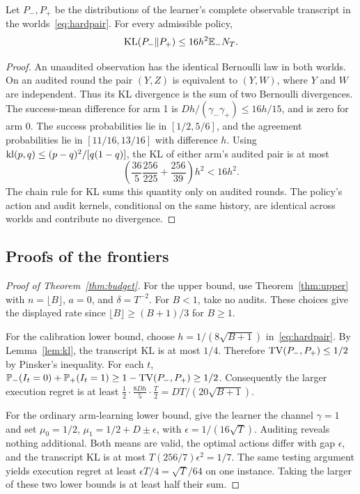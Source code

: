 \begin{lemma}\label{lem:kl}
Let $P_-,P_+$ be the distributions of the learner's complete observable transcript in the worlds~\eqref{eq:hardpair}. For every admissible policy,
\begin{equation}
\operatorname{KL}(P_-\Vert P_+)\leq16h^2\mathbb{E}_-N_T.
\label{eq:transcriptkl}
\end{equation}
\end{lemma}
\begin{proof}
An unaudited observation has the identical Bernoulli law in both worlds. On an audited round the pair $(Y,Z)$ is equivalent to $(Y,W)$, where $Y$ and $W$ are independent. Thus its KL divergence is the sum of two Bernoulli divergences. The success-mean difference for arm 1 is
$Dh/(\gamma_-\gamma_+)\leq16h/15$, and is zero for arm 0. The success probabilities lie in $[1/2,5/6]$, and the agreement probabilities lie in $[11/16,13/16]$ with difference $h$. Using $\operatorname{kl}(p,q)\leq(p-q)^2/[q(1-q)]$, the KL of either arm's audited pair is at most
\begin{equation}
\left(\frac{36}{5}\frac{256}{225}+\frac{256}{39}\right)h^2<16h^2.
\label{eq:klconstant}
\end{equation}
The chain rule for KL sums this quantity only on audited rounds. The policy's action and audit kernels, conditional on the same history, are identical across worlds and contribute no divergence.
\end{proof}

\subsection{Proofs of the frontiers}
\begin{proof}[Proof of Theorem~\ref{thm:budget}]
For the upper bound, use Theorem~\ref{thm:upper} with $n=\lfloor B\rfloor$, $a=0$, and $\delta=T^{-2}$. For $B<1$, take no audits. These choices give the displayed rate since $\lfloor B\rfloor\geq(B+1)/3$ for $B\geq1$.

For the calibration lower bound, choose $h=1/(8\sqrt{B+1})$ in~\eqref{eq:hardpair}. By Lemma~\ref{lem:kl}, the transcript KL is at most $1/4$. Therefore $\operatorname{TV}(P_-,P_+)\leq1/2$ by Pinsker's inequality. For each $t$,
$\mathbb{P}_-(I_t=0)+\mathbb{P}_+(I_t=1)\geq1-\operatorname{TV}(P_-,P_+)\geq1/2$.
Consequently the larger execution regret is at least
$\frac12\cdot\frac{8Dh}{5}\cdot\frac T2=DT/(20\sqrt{B+1})$.

For the ordinary arm-learning lower bound, give the learner the channel $\gamma=1$ and set $\mu_0=1/2$, $\mu_1=1/2+D\pm\epsilon$, with $\epsilon=1/(16\sqrt T)$. Auditing reveals nothing additional. Both means are valid, the optimal actions differ with gap $\epsilon$, and the transcript KL is at most $T(256/7)\epsilon^2=1/7$. The same testing argument yields execution regret at least $\epsilon T/4=\sqrt T/64$ on one instance. Taking the larger of these two lower bounds is at least half their sum.
\end{proof}

